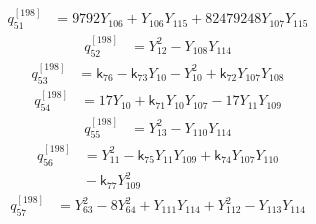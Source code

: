 \begin{equation}\label{q198:row:051}
\begin{aligned}
q_{51}^{[198]} &={} 9792Y_{106} + Y_{106}Y_{115} + 82479248Y_{107}Y_{115}
\end{aligned}
\end{equation}
\begin{equation}\label{q198:row:052}
\begin{aligned}
q_{52}^{[198]} &={} Y_{12}^{2} - Y_{108}Y_{114}
\end{aligned}
\end{equation}
\begin{equation}\label{q198:row:053}
\begin{aligned}
q_{53}^{[198]} &={} \mathsf{k}_{76} - \mathsf{k}_{73}Y_{10} - Y_{10}^{2} + \mathsf{k}_{72}Y_{107}Y_{108}
\end{aligned}
\end{equation}
\begin{equation}\label{q198:row:054}
\begin{aligned}
q_{54}^{[198]} &={} 17Y_{10} + \mathsf{k}_{71}Y_{10}Y_{107} - 17Y_{11}Y_{109}
\end{aligned}
\end{equation}
\begin{equation}\label{q198:row:055}
\begin{aligned}
q_{55}^{[198]} &={} Y_{13}^{2} - Y_{110}Y_{114}
\end{aligned}
\end{equation}
\begin{equation}\label{q198:row:056}
\begin{aligned}
q_{56}^{[198]} &={} Y_{11}^{2} - \mathsf{k}_{75}Y_{11}Y_{109} + \mathsf{k}_{74}Y_{107}Y_{110}\\
&{} - \mathsf{k}_{77}Y_{109}^{2}
\end{aligned}
\end{equation}
\begin{equation}\label{q198:row:057}
\begin{aligned}
q_{57}^{[198]} &={} Y_{63}^{2} - 8Y_{64}^{2} + Y_{111}Y_{114} + Y_{112}^{2} - Y_{113}Y_{114}
\end{aligned}
\end{equation}
